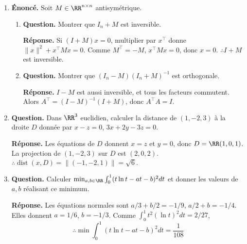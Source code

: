 \documentclass[12pt, a4paper]{article}
\begin{document}
\begin{enumerate}[label=8.\arabic*., start=70]
\begin{minipage}[t]{\linewidth}
\begin{enumerate}[\arabic*.]
\end{enumerate}
\end{minipage}

  \item \begin{minipage}[t]{\linewidth}\raggedright
\textbf{Énoncé.} Soit $M\in\RR^{n\times n}$ antisymétrique.

\begin{enumerate}[\arabic*.]
        \item \textbf{Question.} Montrer que $I_n+M$ est inversible.
\par\smallskip
\textbf{Réponse.} Si $(I+M)x=0$, multiplier par $x^\top$ donne $\|x\|^2+x^\top Mx=0$.
        Comme $M^\top=-M$, $x^\top Mx=0$, donc $x=0$.
        $\therefore I+M$ est inversible.

  \item \textbf{Question.} Montrer que $(I_n-M)(I_n+M)^{-1}$ est orthogonale.
\par\smallskip
\textbf{Réponse.} $I-M$ est aussi inversible, et tous les facteurs commutent.
        Alors $A^\top=(I-M)^{-1}(I+M)$, donc $A^\top A=I$.

\end{enumerate}
\end{minipage}

  \item \begin{minipage}[t]{\linewidth}\raggedright
\textbf{Question.} Dans $\RR^3$ euclidien, calculer la distance de $(1,-2,3)$ à la droite $D$ donnée par $x-z=0$, $3x+2y-3z=0$.
\par\smallskip
\textbf{Réponse.} Les équations de $D$ donnent $x=z$ et $y=0$, donc $D=\RR(1,0,1)$.
    La projection de $(1,-2,3)$ sur $D$ est $(2,0,2)$.
    $\therefore\operatorname{dist}(x,D)=\|(-1,-2,1)\|=\sqrt6$.
\end{minipage}

  \item \begin{minipage}[t]{\linewidth}\raggedright
\textbf{Question.} Calculer $\min_{a,b\in\RR}\int_0^1(t\ln t-at-b)^2dt$ et donner les valeurs de $a,b$ réalisant ce minimum.
\par\smallskip
\textbf{Réponse.} Les équations normales sont
    $a/3+b/2=-1/9$, $a/2+b=-1/4$.
    Elles donnent $a=1/6$, $b=-1/3$.
    Comme $\int_0^1t^2(\ln t)^2dt=2/27$,
    \[
      \therefore\min\int_0^1(t\ln t-at-b)^2dt=\frac1{108}
    \]
\end{minipage}


\end{enumerate}
\end{document}
